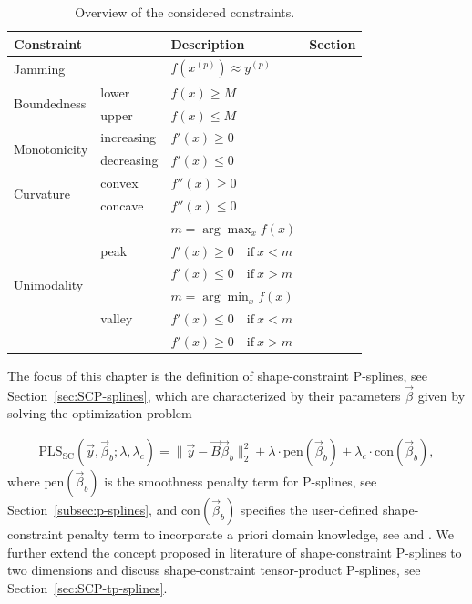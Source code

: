 \begin{table}[H]
	\centering
	\begin{tabular}{|l|ll|l|}
		\hline
		\textbf{Constraint}& & \textbf{Description}   & \textbf{Section}     \\ \hline \toprule
		Jamming            & & $f(x^{(p)}) \approx y^{(p)}$ & \pref{subsec:JammC} \\ \hline 
		\multirow{2}{*}{Boundedness}  & lower & $f(x)\ge M$ 	  &	\pref{subsec:BoudC} \\ \cline{2-4}
		& upper & $f(x)\le M$    & \pref{subsec:BoudC} \\ \hline
		\multirow{2}{*}{Monotonicity} & increasing & $f'(x) \ge 0$ 	& \pref{subsec:MIC} \\ \cline{2-4}
		& decreasing & $f'(x) \le 0$  & \pref{subsec:MDC} \\ \hline	
		\multirow{2}{*}{Curvature}    & convex     & $f''(x)\ge 0$ 	& \pref{subsec:ConvC} \\ \cline{2-4}
		& concave    & $f''(x)\le 0$ 	& \pref{subsec:ConcC} \\ \hline
		\multirow{6}{*}{Unimodality}  & \multirow[t]{3}{*}{peak}  & $m = \arg \max_{x} f(x)$  & \pref{subsec:PeakC} \\ 
		&	                       & $f'(x) \ge 0 \quad \text{if} \ x < m$ & \\ 
		&  				       & $f'(x) \le 0 \quad \text{if} \ x > m$ & \\ \cline{2-4} 
		& \multirow[t]{3}{*}{valley}& $m = \arg \min_{x} f(x)$  & \pref{subsec:ValleyC} \\ 
		&	                       & $f'(x) \le 0 \quad \text{if} \ x < m$ & \\ 
		&  				       & $f'(x) \ge 0 \quad \text{if} \ x > m$ &  \\ \hline		\bottomrule
	\end{tabular}
	\caption{Overview of the considered constraints.}
	\label{tab:constraint_overview}
\end{table}
%
The focus of this chapter is the definition of shape-constraint P-splines, see Section~\ref{sec:SCP-splines}, which are characterized by their parameters $\vec{\beta}$ given by solving the optimization problem

\begin{align} \label{eq:OF-SCP-splines}
	\text{PLS}_{\text{SC}} (\vec{y}, \vec{\beta}_b; \lambda, \lambda_c) = \lVert \vec{y} - \vec{B} \vec{\beta}_b \rVert_2^2 + \lambda \cdot \text{pen}(\vec{\beta}_b) + \lambda_c \cdot \text{con}(\vec{\beta}_b),
\end{align}
%
where $\text{pen}(\vec{\beta}_b)$ is the smoothness penalty term for P-splines, see Section~\ref{subsec:p-splines}, and $\text{con}(\vec{\beta}_b)$ specifies the user-defined shape-constraint penalty term to incorporate a priori domain knowledge, see \cite{hofner2011monotonicity} and \cite{bollaerts2006simple}. We further extend the concept proposed in literature of shape-constraint P-splines to two dimensions and discuss shape-constraint tensor-product P-splines, see Section~\ref{sec:SCP-tp-splines}.

